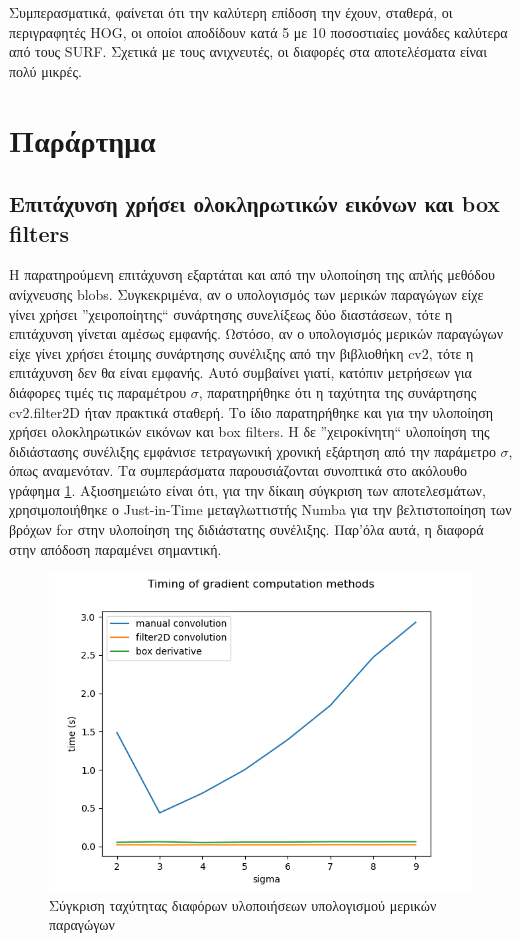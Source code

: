 \documentclass{article}
\newcommand{\eng}[1]{\foreignlanguage{english}{#1}}
\begin{document}
Συμπερασματικά, φαίνεται ότι την καλύτερη επίδοση την έχουν, σταθερά, οι περιγραφητές \eng{HOG}, οι οποίοι αποδίδουν κατά 5 με 10 ποσοστιαίες μονάδες καλύτερα από τους \eng{SURF}. Σχετικά με τους ανιχνευτές, οι διαφορές στα αποτελέσματα είναι πολύ μικρές. 

\newpage
\section{Παράρτημα}
\subsection{Επιτάχυνση χρήσει ολοκληρωτικών εικόνων και \eng{box filters}}
\label{section:details}

Η παρατηρούμενη επιτάχυνση εξαρτάται και από την υλοποίηση της απλής μεθόδου ανίχνευσης \eng{blobs}. Συγκεκριμένα, αν ο υπολογισμός των μερικών παραγώγων είχε γίνει χρήσει ''χειροποίητης`` συνάρτησης συνελίξεως δύο διαστάσεων, τότε η επιτάχυνση γίνεται αμέσως εμφανής. Ωστόσο, αν ο υπολογισμός μερικών παραγώγων είχε γίνει χρήσει έτοιμης συνάρτησης συνέλιξης από την βιβλιοθήκη \eng{cv2}, τότε η επιτάχυνση δεν θα είναι εμφανής. Αυτό συμβαίνει γιατί, κατόπιν μετρήσεων για διάφορες τιμές τις παραμέτρου $\sigma$, παρατηρήθηκε ότι η ταχύτητα της συνάρτησης  \eng{cv2.filter2D} ήταν πρακτικά σταθερή. Το ίδιο παρατηρήθηκε και για την υλοποίηση χρήσει ολοκληρωτικών εικόνων και \eng{box filters}. Η δε ''χειροκίνητη`` υλοποίηση της διδιάστασης συνέλιξης εμφάνισε τετραγωνική χρονική εξάρτηση από την παράμετρο $\sigma$, όπως αναμενόταν. Τα συμπεράσματα παρουσιάζονται συνοπτικά στο ακόλουθο γράφημα \ref{fig:grad-comparison}. Αξιοσημειώτο είναι ότι, για την δίκαιη σύγκριση των αποτελεσμάτων, χρησιμοποιήθηκε ο \eng{Just-in-Time} μεταγλωττιστής \eng{Numba} για την βελτιστοποίηση των βρόχων \eng{for} στην υλοποίηση της διδιάστατης συνέλιξης. Παρ'όλα αυτά, η διαφορά στην απόδοση παραμένει σημαντική.

\begin{figure}[h]
    \centering
    \includegraphics[width=\textwidth]{../image-plots/grad-comparison.png}
    \caption{Σύγκριση ταχύτητας διαφόρων υλοποιήσεων υπολογισμού μερικών παραγώγων}
    \label{fig:grad-comparison}
\end{figure}
\FloatBarrier
\end{document}
